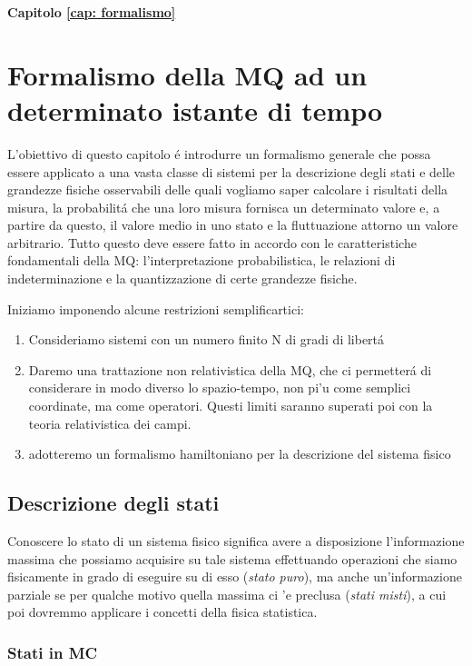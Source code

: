 \vspace{5em}
\label{cap: formalismo}
\textbf{\Large Capitolo \ref{cap: formalismo}} 
\section{\huge Formalismo della MQ ad un determinato istante di tempo}


L'obiettivo di questo capitolo \'e introdurre un formalismo generale che possa essere applicato a una vasta classe di sistemi per la descrizione degli stati e delle grandezze fisiche osservabili delle quali vogliamo saper calcolare i risultati della misura, la probabilit\'a che una loro misura fornisca un determinato valore e, a partire da questo, il valore medio in uno stato e la fluttuazione attorno un valore arbitrario. Tutto questo deve essere fatto in accordo con le caratteristiche fondamentali della MQ: l'interpretazione probabilistica, le relazioni di indeterminazione e la quantizzazione di certe grandezze fisiche.

Iniziamo imponendo alcune restrizioni semplificartici:
\begin{enumerate}
\item Consideriamo sistemi con un numero finito N di gradi di libert\'a 

\item Daremo una trattazione non relativistica della MQ, che ci permetter\'a di considerare in modo diverso lo spazio-tempo, non pi'u come semplici coordinate, ma come operatori. Questi limiti saranno superati poi con la teoria relativistica dei campi.

\item adotteremo un formalismo hamiltoniano per la descrizione del sistema fisico
\end{enumerate}

\subsection{Descrizione degli stati}

Conoscere lo stato di un sistema fisico significa avere a disposizione l'informazione massima che possiamo acquisire su tale sistema effettuando operazioni che siamo fisicamente in grado di eseguire su di esso (\textit{stato puro}), ma anche un'informazione parziale se per qualche motivo quella massima ci 'e preclusa (\textit{stati misti}), a cui poi dovremmo applicare i concetti della fisica statistica.


\subsubsection{Stati in MC}

